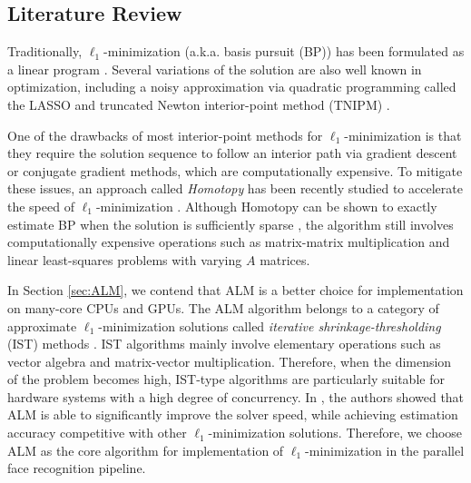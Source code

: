\subsection{Literature Review} 
Traditionally, $\ell_1$-minimization (a.k.a.
basis pursuit (BP)) has been formulated as a linear program
\cite{ChenS2001-SIAM}. Several variations of the solution are also well known
in optimization, including a noisy approximation via quadratic programming
called the LASSO \cite{TibshiraniR1996} and truncated Newton interior-point
method (TNIPM) \cite{KimS2007}.

One of the drawbacks of most interior-point methods for $\ell_1$-minimization is that they require the solution sequence to follow an
interior path via gradient descent or conjugate gradient methods, which are computationally expensive.
To mitigate these issues, an approach called \emph{Homotopy} has been recently studied to accelerate the
speed of $\ell_1$-minimization \cite{OsborneM2000,EfronB2004,MalioutovD2005,DonohoD2006}.
Although Homotopy can be shown to exactly estimate BP when the solution is
sufficiently sparse \cite{DonohoD2006}, the algorithm still involves
computationally expensive operations such as matrix-matrix multiplication and
linear least-squares problems with varying $A$
matrices.



In Section \ref{sec:ALM}, we contend that ALM is a better choice for
implementation on many-core CPUs and GPUs. The ALM algorithm belongs to a
category of approximate $\ell_1$-minimization solutions called \emph{iterative
shrinkage-thresholding} (IST) methods \cite{WrightS2008,BeckA2009}.  IST
algorithms mainly involve elementary operations such as vector algebra and
matrix-vector multiplication. Therefore, when the dimension of the problem
becomes high, IST-type algorithms are particularly suitable for hardware
systems with a high degree of concurrency. In \cite{YangA2010-ICIP}, the
authors showed that ALM is able to significantly improve the solver speed,
while achieving estimation accuracy competitive with other $\ell_1$-minimization
solutions. Therefore, we choose ALM as the core algorithm for
implementation of $\ell_1$-minimization in the parallel face recognition pipeline.

